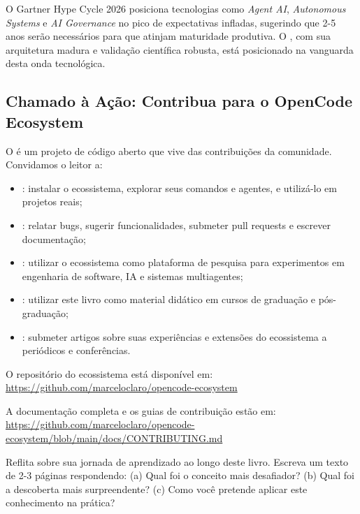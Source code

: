 O Gartner Hype Cycle 2026 \cite{gartner2026hype} posiciona tecnologias como
\textit{Agent AI}, \textit{Autonomous Systems} e \textit{AI Governance} no
pico de expectativas infladas, sugerindo que 2-5 anos serão necessários para
que atinjam maturidade produtiva. O \opencodeeco{}, com sua arquitetura
madura e validação científica robusta, está posicionado na vanguarda desta
onda tecnológica.

\subsection{Chamado à Ação: Contribua para o OpenCode Ecosystem}

O \opencodeeco{} é um projeto de código aberto que vive das contribuições da
comunidade. Convidamos o leitor a:

\begin{itemize}
\item {}: instalar o ecossistema, explorar seus comandos
      e agentes, e utilizá-lo em projetos reais;
\item {}: relatar bugs, sugerir funcionalidades, submeter
      pull requests e escrever documentação;
\item {}: utilizar o ecossistema como plataforma de pesquisa
      para experimentos em engenharia de software, IA e sistemas multiagentes;
\item {}: utilizar este livro como material didático em cursos
      de graduação e pós-graduação;
\item {}: submeter artigos sobre suas experiências e
      extensões do ecossistema a periódicos e conferências.
\end{itemize}

O repositório do ecossistema está disponível em:
\url{https://github.com/marceloclaro/opencode-ecosystem}

A documentação completa e os guias de contribuição estão em:
\url{https://github.com/marceloclaro/opencode-ecosystem/blob/main/docs/CONTRIBUTING.md}

\begin{exercicio}
    Reflita sobre sua jornada de aprendizado ao longo deste livro. Escreva um
    texto de 2-3 páginas respondendo: (a) Qual foi o conceito mais desafiador?
    (b) Qual foi a descoberta mais surpreendente? (c) Como você pretende
    aplicar este conhecimento na prática?
\end{exercicio}

